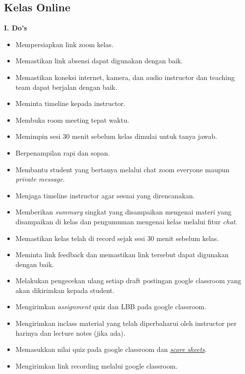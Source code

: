 \documentclass[
]{book}
\providecommand{\tightlist}{%
  \setlength{\itemsep}{0pt}\setlength{\parskip}{0pt}}
\begin{document}
\hypertarget{kelas-online-4}{%
\subsection{Kelas Online}\label{kelas-online-4}}

\textbf{I. Do's}

\begin{itemize}
\tightlist
\item
  Mempersiapkan link zoom kelas.
\item
  Memastikan link absensi dapat digunakan dengan baik.
\item
  Memastikan koneksi internet, kamera, dan audio instructor dan teaching team dapat berjalan dengan baik.
\item
  Meminta timeline kepada instructor.
\item
  Membuka room meeting tepat waktu.
\item
  Memimpin sesi 30 menit sebelum kelas dimulai untuk tanya jawab.
\item
  Berpenampilan rapi dan sopan.
\item
  Membantu student yang bertanya melalui chat zoom everyone maupun \emph{private message}.
\item
  Menjaga timeline instructor agar sesuai yang direncanakan.
\item
  Memberikan \emph{summary} singkat yang disampaikan mengenai materi yang disampaikan di kelas dan pengumuman mengenai kelas melalui fitur \emph{chat}.
\item
  Memastikan kelas telah di record sejak sesi 30 menit sebelum kelas.
\item
  Meminta link feedback dan memastikan link tersebut dapat digunakan dengan baik.
\item
  Melakukan pengecekan ulang setiap draft postingan google classroom yang akan dikirimkan kepada student.
\item
  Mengirimkan \emph{assignment} quiz dan LBB pada google classroom.
\item
  Mengirimkan inclass material yang telah diperbaharui oleh instructor per harinya dan lecture notes (jika ada).
\item
  Memasukkan nilai quiz pada google classroom dan \href{https://docs.google.com/spreadsheets/d/1cGJ0pn9k9gKCBnceWVwaL9D7BBDMNjLh8uPYlaBlJi8/edit\#gid=1518964141}{\emph{score sheets}}.
\item
  Mengirimkan link recording melalui google classroom.
\end{itemize}
\end{document}

